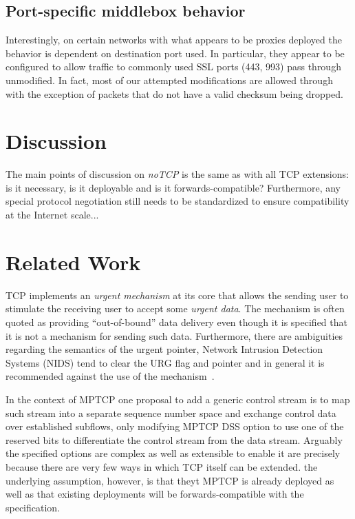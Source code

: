 \documentclass{sig-alternate-10pt}
\begin{document}
\subsection{Port-specific middlebox behavior}

Interestingly, on certain networks with what appears to be proxies deployed the behavior is dependent on destination port used. In particular, they appear to be configured to allow traffic to commonly used SSL ports (443, 993) pass through unmodified. In fact, most of our attempted modifications are allowed through with the exception of packets that do not have a valid checksum being dropped.

\section{Discussion}

The main points of discussion on \emph{noTCP} is the same as with all TCP extensions: is it necessary, is it deployable and is it forwards-compatible? Furthermore, any special protocol negotiation still needs to be standardized to ensure compatibility at the Internet scale...



\section{Related Work}
\label{sec:related}

TCP implements an \emph{urgent mechanism} at its core that allows the sending user to stimulate the receiving user to accept some \emph{urgent data}. The mechanism is often quoted as providing ``out-of-bound'' data delivery even though it is specified that it is not a mechanism for sending such data. Furthermore, there are ambiguities regarding the semantics of the urgent pointer, Network Intrusion Detection Systems (NIDS) tend to clear the URG flag and pointer and in general it is recommended against the use of the mechanism~\cite{Gont:2011vi}.

In the context of MPTCP one proposal to add a generic control stream is to map such stream into a separate sequence number space and exchange control data over established subflows, only modifying MPTCP DSS option to use one of the reserved bits to differentiate the control stream from the data stream. Arguably the specified options are complex as well as extensible to enable it are precisely because there are very few ways in which TCP itself can be extended. the underlying assumption, however, is that theyt MPTCP is already deployed as well as that existing deployments will be forwards-compatible with the specification.
\end{document}
